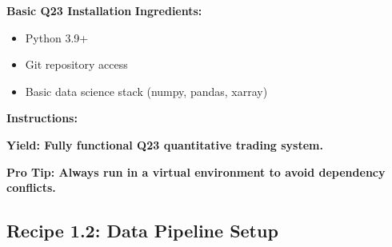\documentclass[11pt,letterpaper,openany]{book}
\begin{document}
\textbf{Basic Q23 Installation}
\textbf{Ingredients:}
\begin{itemize}
    \item Python 3.9+
    \item Git repository access
    \item Basic data science stack (numpy, pandas, xarray)
\end{itemize}

\textbf{Instructions:}




\textbf{Yield: Fully functional Q23 quantitative trading system.}

\textbf{Pro Tip: Always run in a virtual environment to avoid dependency conflicts.}

\subsection{Recipe 1.2: Data Pipeline Setup}
\end{document}
